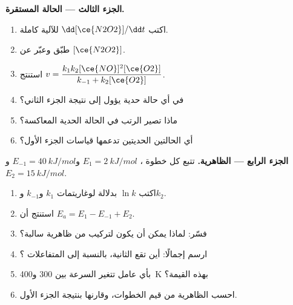 \begin{problem}
\medskip
\noindent\textbf{الجزء الثالث --- الحالة المستقرة.}
\begin{enumerate}[resume]
  \item اكتب $\dd[\ce{N2O2}]/\dd t$ للآلية كاملة.
  \item طبّق  وعبّر عن $[\ce{N2O2}]$.
  \item استنتج  $v = \dfrac{k_1k_2[\ce{NO}]^2[\ce{O2}]}{k_{-1} +
        k_2[\ce{O2}]}$.
  \item في أي حالة حدية يؤول إلى نتيجة الجزء الثاني؟
  \item ماذا تصير الرتب في الحالة الحدية المعاكسة؟
  \item أي الحالتين الحديتين تدعمها قياسات الجزء الأول؟
\end{enumerate}

\medskip
\noindent\textbf{الجزء الرابع ---  الظاهرية.}
تتبع كل خطوة ،  $E_1 =
\qty{2}{kJ/mol}$ و$E_{-1} = \qty{40}{kJ/mol}$ و$E_2 =
\qty{15}{kJ/mol}$.
\begin{enumerate}[resume]
  \item اكتب $\ln k$ بدلالة لوغاريتمات $k_1$ و$k_{-1}$
        و$k_2$.
  \item استنتج أن $E_a = E_1 - E_{-1} + E_2$.
  \item فسّر: لماذا يمكن أن يكون لتركيب من   ظاهرية سالبة؟
  \item ارسم  إجمالًا: أين تقع  الثانية،
        بالنسبة إلى المتفاعلات ؟
  \item بأي عامل تتغير السرعة بين 300 و\qty{400}{K}
        بهذه القيمة؟
  \item احسب  الظاهرية من قيم الخطوات،
        وقارنها بنتيجة الجزء الأول.
\end{enumerate}
\end{problem}
